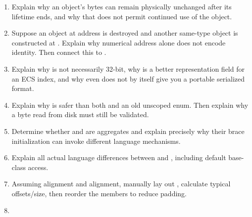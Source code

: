\begin{enumerate}
\item
  Explain why an object's bytes can remain physically unchanged after its lifetime ends, and why that does not permit continued use of the object.
\item
  Suppose an object at address  is destroyed and another same-type object is constructed at . Explain why numerical address alone does not encode identity. Then connect this to .
\item
  Explain why  is not necessarily 32-bit, why  is a better representation field for an ECS index, and why even  does not by itself give you a portable serialized format.
\item
  Explain why  is safer than both  and an old unscoped enum. Then explain why a byte read from disk must still be validated.
\item
  Determine whether  and  are aggregates and explain precisely why their brace initialization can invoke different language mechanisms.
\item
  Explain all actual language differences between  and , including default base-class access.
\item
  Assuming  alignment and  alignment, manually lay out , calculate typical offsets/size, then reorder the members to reduce padding.
\item

\end{enumerate}
